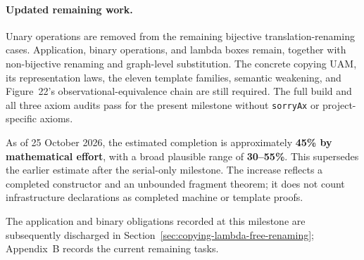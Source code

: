 
\paragraph{Updated remaining work.}
Unary operations are removed from the remaining bijective translation-renaming
cases. Application, binary operations, and lambda boxes remain, together with
non-bijective renaming and graph-level substitution. The concrete copying UAM,
its representation laws, the eleven template families, semantic weakening,
and Figure~22's observational-equivalence chain are still required. The full
build and all three axiom audits pass for the present milestone without
\texttt{sorryAx} or project-specific axioms.

As of 25 October 2026, the estimated completion is approximately
\textbf{45\% by mathematical effort}, with a broad plausible range of
\textbf{30--55\%}. This supersedes the earlier estimate after the serial-only
milestone. The increase reflects a completed constructor and an unbounded
fragment theorem; it does not count infrastructure declarations as completed
machine or template proofs.


The application and binary obligations recorded at this milestone are subsequently
discharged in Section~\ref{sec:copying-lambda-free-renaming}; Appendix~B records
the current remaining tasks.
